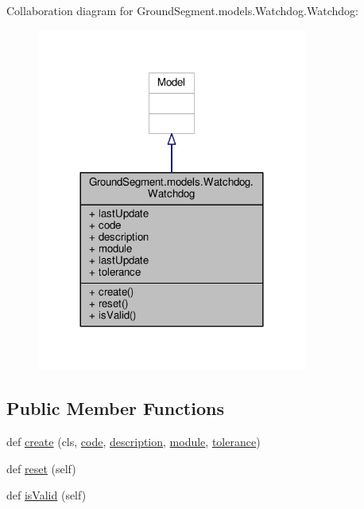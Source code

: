 Collaboration diagram for Ground\+Segment.\+models.\+Watchdog.\+Watchdog\+:\nopagebreak
\begin{figure}[H]
\begin{center}
\leavevmode
\includegraphics[width=252pt]{class_ground_segment_1_1models_1_1_watchdog_1_1_watchdog__coll__graph}
\end{center}
\end{figure}
\subsection*{Public Member Functions}
\begin{DoxyCompactItemize}
\item 
def \hyperlink{class_ground_segment_1_1models_1_1_watchdog_1_1_watchdog_a063f49fcc21dbb4f861c2e6e291cc1bb}{create} (cls, \hyperlink{class_ground_segment_1_1models_1_1_watchdog_1_1_watchdog_a9548413d6e37739ac54bdaa3a75d66f4}{code}, \hyperlink{class_ground_segment_1_1models_1_1_watchdog_1_1_watchdog_ab6bf4dee4015f39a9c62850ee3ca830e}{description}, \hyperlink{class_ground_segment_1_1models_1_1_watchdog_1_1_watchdog_ad2304bdf1d4275622b13386e224550a3}{module}, \hyperlink{class_ground_segment_1_1models_1_1_watchdog_1_1_watchdog_abb2ac1834f5367e279b537108087a4f8}{tolerance})
\item 
def \hyperlink{class_ground_segment_1_1models_1_1_watchdog_1_1_watchdog_aadb34213f1de7bec981332ca73decf2c}{reset} (self)
\item 
def \hyperlink{class_ground_segment_1_1models_1_1_watchdog_1_1_watchdog_a7e69e83c40e41bed9e6f2aa44d18b47d}{is\+Valid} (self)
\end{DoxyCompactItemize}
